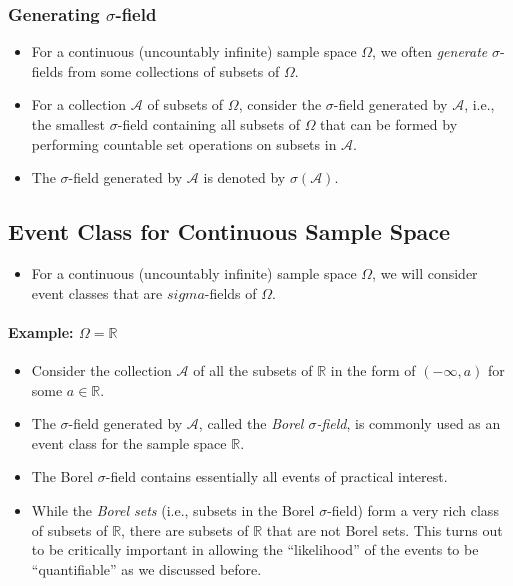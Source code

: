 \subsubsection{Generating \(\sigma\)-field}
\begin{itemize}
\item For a continuous (uncountably infinite) sample space \(\Omega\),
  we often \emph{generate} \(\sigma\)-fields from some collections of
  subsets of \(\Omega\).
\item For a collection \(\mathcal{A}\) of subsets of \(\Omega\),
  consider the \(\sigma\)-field generated by \(\mathcal{A}\), i.e.,
  the smallest \(\sigma\)-field containing all subsets of \(\Omega\)
  that can be formed by performing countable set operations on subsets
  in \(\mathcal{A}\).
\item The \(\sigma\)-field generated by \(\mathcal{A}\) is denoted by
  \(\sigma(\mathcal{A})\).
\end{itemize}

\subsection{Event Class for Continuous Sample Space}
\begin{itemize}
\item For a continuous (uncountably infinite) sample space \(\Omega\),
  we will consider event classes that are \(sigma\)-fields of
  \(\Omega\).
\end{itemize}

\paragraph{Example: \(\Omega=\mathbb{R}\)}
\begin{itemize}
\item Consider the collection \(\mathcal{A}\) of all the subsets of
  \(\mathbb{R}\) in the form of \((-\infty, a)\) for some
  \(a \in \mathbb{R}\).
\item The \(\sigma\)-field generated by \(\mathcal{A}\), called the
  \emph{Borel \(\sigma\)-field}, is commonly used as an event class for
  the sample space \(\mathbb{R}\).
\item The Borel \(\sigma\)-field contains essentially all events of
  practical interest.
\item While the \emph{Borel sets} (i.e., subsets in
  the Borel \(\sigma\)-field) form a very rich class of subsets  of
  \(\mathbb{R}\), there are subsets of \(\mathbb{R}\) that are not
  Borel sets. This turns out to be critically important in allowing the
  ``likelihood'' of the events to be ``quantifiable'' as we discussed
  before.
\end{itemize}


